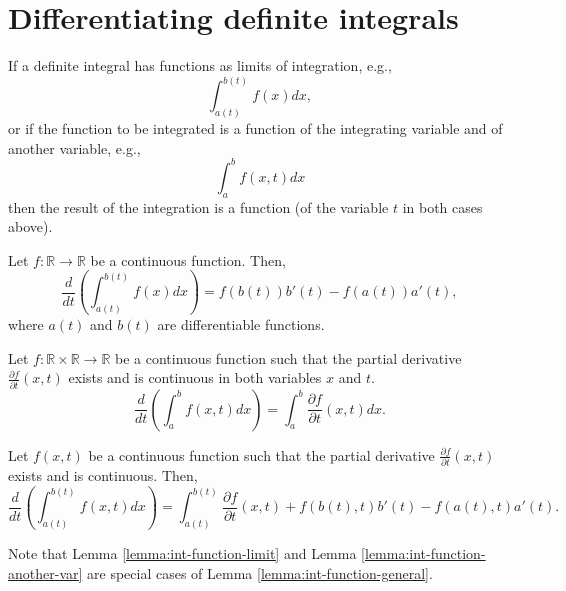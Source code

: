 \section{Differentiating definite integrals}
If a definite integral has functions as limits of integration, e.g.,
\begin{equation*}
    \int_{a(t)}^{b(t)} f(x) dx,
\end{equation*}
or if the function to be integrated is a function of the integrating variable
    and of another variable, e.g.,
\begin{equation*}
    \int_{a}^{b} f(x, t) dx
\end{equation*}
then the result of the integration is a function (of the variable $ t $ in both
    cases above).

\begin{lemma}\label{lemma:int-function-limit}
    Let $ f : \mathbb{R} \rightarrow \mathbb{R} $ be a continuous function.
    Then,
    \begin{equation}
        \frac{d}{dt} \left( \int_{a(t)}^{b(t)} f(x) dx \right) = f(b(t)) b'(t) -
            f(a(t)) a'(t),
        \label{eq:lemma:int-function-limit}
    \end{equation}
    where $ a(t) $ and $ b(t) $ are differentiable functions.
\end{lemma}

\begin{lemma}\label{lemma:int-function-another-var}
    Let $ f : \mathbb{R} \times \mathbb{R} \rightarrow \mathbb{R} $ be a
        continuous function such that the partial derivative
        $ \frac{\partial f}{\partial t} (x, t) $ exists and is continuous in
        both variables $ x $ and $ t $.
    \begin{equation}
        \frac{d}{dt} \left( \int_{a}^{b} f(x, t) dx \right) = \int_{a}^{b}
            \frac{\partial f}{\partial t} (x, t) dx.
        \label{eq:lemma:int-function-another-var}
    \end{equation}
\end{lemma}

\begin{lemma}\label{lemma:int-function-general}
    Let $ f(x, t) $ be a continuous function such that the partial derivative
        $ \frac{\partial f}{\partial t} (x, t) $ exists and is continuous.
    Then,
    \begin{equation*}
        \frac{d}{dt} \left( \int_{a(t)}^{b(t)} f(x, t) dx \right) =
            \int_{a(t)}^{b(t)} \frac{\partial f}{\partial t} (x, t) +
            f(b(t), t) b'(t) - f(a(t), t) a'(t).
    \end{equation*}
\end{lemma}
Note that Lemma \ref{lemma:int-function-limit} and Lemma
    \ref{lemma:int-function-another-var} are special cases of Lemma
    \ref{lemma:int-function-general}.

